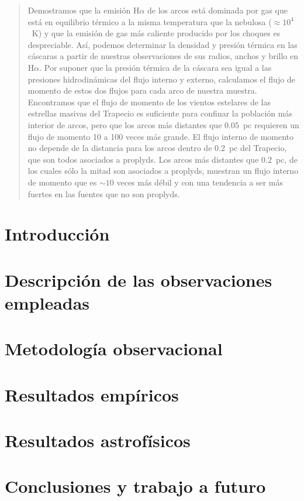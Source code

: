 \documentclass{report}
\begin{document}
\begin{abstract}
  Demostramos que la emisión H$\alpha$ de los arcos está dominada por
  gas que está en equilibrio térmico a la misma temperatura que la
  nebulosa ($\approx 10^4$~K) y que la emisión de gas más caliente
  producido por los choques es despreciable.  Así, podemos determinar
  la densidad y presión térmica en las cáscaras a partir de nuestras
  observaciones de sus radios, anchos y brillo en H$\alpha$.  Por
  suponer que la presión térmica de la cáscara sea igual a las
  presiones hidrodinámicas del flujo interno y externo, calculamos el
  flujo de momento de estos dos flujos para cada arco de nuestra
  muestra.  Encontramos que el flujo de momento de los vientos
  estelares de las estrellas masivas del Trapecio es suficiente para
  confinar la población más interior de arcos, pero que los arcos más
  distantes que $0.05$~pc requieren un flujo de momento 10 a
  100 veces más grande.  El flujo interno de momento no depende de la
  distancia para los arcos dentro de $0.2$~pc del Trapecio, que son
  todos asociados a proplyds.  Los arcos más distantes que $0.2$~pc,
  de los cuales sólo la mitad son asociados a proplyds,
  muestran un flujo interno de momento que es $\sim 10$ veces más
  débil y con una tendencia a ser más fuertes en las fuentes que no
  son proplyds.
\end{abstract}

\renewcommand{\thepage}{\arabic{page}}
\setcounter{page}{1}

\chapter{Introducción}

\chapter{Descripción de las observaciones empleadas}

\chapter{Metodología observacional}

\chapter{Resultados empíricos}

\chapter{Resultados astrofísicos}

\chapter{Conclusiones y trabajo a futuro}



\end{document}
